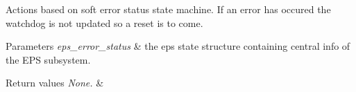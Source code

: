 Actions based on soft error status state machine. If an error has occured the watchdog is not updated so a reset is to come. 


\begin{DoxyParams}{Parameters}
{\em eps\-\_\-error\-\_\-status} & the eps state structure containing central info of the E\-P\-S subsystem. \\
\hline
\end{DoxyParams}

\begin{DoxyRetVals}{Return values}
{\em None.} & \\
\hline
\end{DoxyRetVals}
